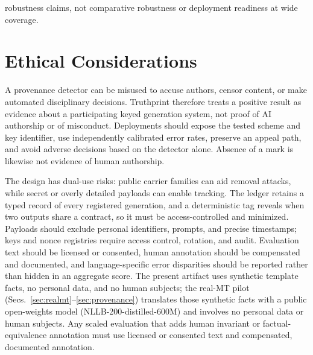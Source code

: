 \documentclass[11pt]{article}
\begin{document}
robustness claims, not comparative robustness or deployment readiness at wide coverage.

\section*{Ethical Considerations}
A provenance detector can be misused to accuse authors, censor content, or make automated disciplinary decisions. Truthprint therefore treats a positive result as evidence about a participating keyed generation system, not proof of AI authorship or of misconduct. Deployments should expose the tested scheme and key identifier, use independently calibrated error rates, preserve an appeal path, and avoid adverse decisions based on the detector alone. Absence of a mark is likewise not evidence of human authorship.

The design has dual-use risks: public carrier families can aid removal attacks, while secret or overly detailed payloads can enable tracking. The ledger retains a typed record of every registered generation, and a deterministic tag reveals when two outputs share a contract, so it must be access-controlled and minimized. Payloads should exclude personal identifiers, prompts, and precise timestamps; keys and nonce registries require access control, rotation, and audit. Evaluation text should be licensed or consented, human annotation should be compensated and documented, and language-specific error disparities should be reported rather than hidden in an aggregate score. The present artifact uses synthetic template facts, no personal data, and no human subjects; the real-MT pilot (Secs.~\ref{sec:realmt}--\ref{sec:provenance}) translates those synthetic facts with a public open-weights model (NLLB-200-distilled-600M) and involves no personal data or human subjects. Any scaled evaluation that adds human invariant or factual-equivalence annotation must use licensed or consented text and compensated, documented annotation.


\appendix
\end{document}
